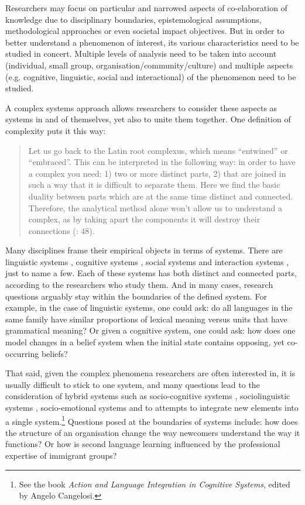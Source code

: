 \documentclass[output=paper]{langscibook}
\begin{document}
Researchers may focus on particular and narrowed aspects of co-elaboration of knowledge due to disciplinary boundaries, epistemological assumptions, methodological approaches or even societal impact objectives. But in order to better understand a phenomenon of interest, its various characteristics need to be studied in concert. Multiple levels of analysis need to be taken into account (individual, small group, organisation/community/culture) and multiple aspects (e.g. cognitive, linguistic, social and interactional) of the phenomenon need to be studied. 

A complex systems approach allows researchers to consider these aspects as systems in and of themselves, yet also to unite them together. One definition of complexity puts it this way:

\begin{quote}
Let us go back to the Latin root complexus, which means “entwined” or “embraced”. This can be interpreted in the following way: in order to have a complex you need: 1) two or more distinct parts, 2) that are joined in such a way that it is difficult to separate them. Here we find the basic duality between parts which are at the same time distinct and connected. Therefore, the analytical method alone won’t allow us to understand a complex, as by taking apart the components it will destroy their connections (\citealt{GershensonHeylighen2005}:  48).
\end{quote}

Many disciplines frame their empirical objects in terms of systems. There are linguistic systems \citep{Grinevald2001}, cognitive systems \citep{Woods1986}, social systems \citep{Parsons1951} and interaction systems \citep{VissersEtAl2016}, just to name a few. Each of these systems has both distinct and connected parts, according to the researchers who study them. And in many cases, research questions arguably stay within the boundaries of the defined system. For example, in the case of linguistic systems, one could ask: do all languages in the same family have similar proportions of lexical meaning versus units that have grammatical meaning? Or given a cognitive system, one could ask: how does one model changes in a belief system when the initial state contains opposing, yet co-occurring beliefs?\largerpage

That said, given the complex phenomena researchers are often interested in, it is usually difficult to stick to one system, and many questions lead to the consideration of hybrid systems such as socio-cognitive systems \citep{NoriegaEtAl2014}, sociolinguistic systems \citep{Hymes1967}, socio-emotional systems \citep{PankseppEtAl2002} and to attempts to integrate new elements into a single system.\footnote{See the book \textit{Action and Language Integration in Cognitive Systems}, edited by Angelo Cangelosi.} Questions posed at the boundaries of systems include: how does the structure of an organisation change the way newcomers understand the way it functions? Or how is second language learning influenced by the professional expertise of immigrant groups?
\end{document}
